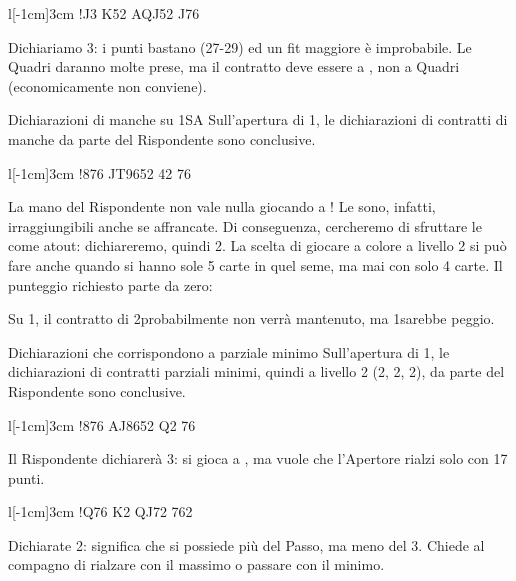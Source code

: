 \documentclass[../corsofiori.tex]{subfiles}
\begin{document}
\begin{wraptable}[4]{l}[-1cm]{3cm}
\hand!{J3} {K52} {AQJ52} {J76}
\end{wraptable}

Dichiariamo 3\SA: i punti bastano
(27-29) ed un fit maggiore è
improbabile. Le Quadri daranno molte
prese, ma il contratto deve essere a
\SA, non a Quadri (economicamente non conviene).

\begin{regola}{Dichiarazioni di manche su 1{\small SA}}
    Sull'apertura di 1\SA, le dichiarazioni di contratti di manche da parte del Rispondente sono conclusive.
\end{regola}

\begin{wraptable}[5]{l}[-1cm]{3cm}
\hand!{876} {JT9652} {42} {76}
\end{wraptable}

La mano del Rispondente non vale nulla giocando a \SA! Le \cu sono, infatti, irraggiungibili anche se affrancate. Di
conseguenza, cercheremo di sfruttare le \cu come atout: dichiareremo, quindi 2\He. La scelta di giocare a colore
a livello 2 si può fare anche quando si hanno sole 5 carte in quel seme, ma mai con solo 4 carte. Il punteggio richiesto
parte da zero:


Su 1\SA, il contratto di 2\He probabilmente non verrà mantenuto, ma 1\SA sarebbe peggio.


\begin{regola}{Dichiarazioni che corrispondono a parziale minimo}
    Sull'apertura di 1\SA, le dichiarazioni di contratti parziali minimi, quindi a livello 2 (2\Di, 2\He, 2\Sp), da parte del Rispondente sono conclusive.
\end{regola}

\begin{wraptable}[2]{l}[-1cm]{3cm}
\hand!{876} {AJ8652} {Q2} {76}
\end{wraptable}

Il Rispondente dichiarerà 3\BH: si gioca a \cu, ma vuole che l'Apertore rialzi solo con 17 punti.


\vspace{1cm}

\begin{wraptable}[3]{l}[-1cm]{3cm}
\hand!{Q76} {K2} {QJ72} {762}
\end{wraptable}


Dichiarate 2\SA: significa che si possiede più del Passo, ma meno del 3\SA. Chiede al compagno di rialzare con il
massimo o passare con il minimo.
\end{document}
